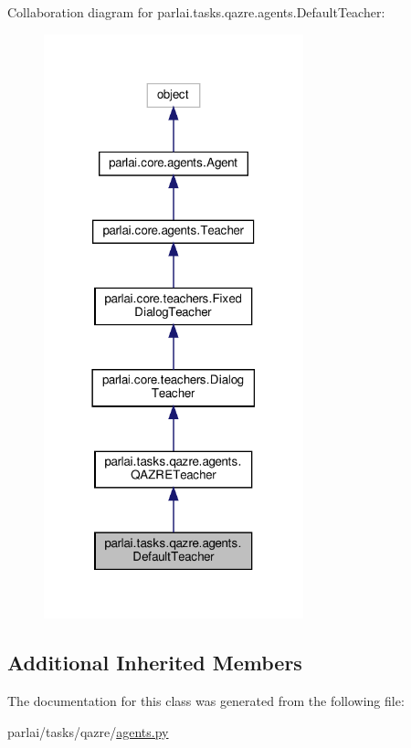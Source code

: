 Collaboration diagram for parlai.\+tasks.\+qazre.\+agents.\+Default\+Teacher\+:
\nopagebreak
\begin{figure}[H]
\begin{center}
\leavevmode
\includegraphics[width=213pt]{classparlai_1_1tasks_1_1qazre_1_1agents_1_1DefaultTeacher__coll__graph}
\end{center}
\end{figure}
\subsection*{Additional Inherited Members}


The documentation for this class was generated from the following file\+:\begin{DoxyCompactItemize}
\item 
parlai/tasks/qazre/\hyperlink{parlai_2tasks_2qazre_2agents_8py}{agents.\+py}\end{DoxyCompactItemize}
